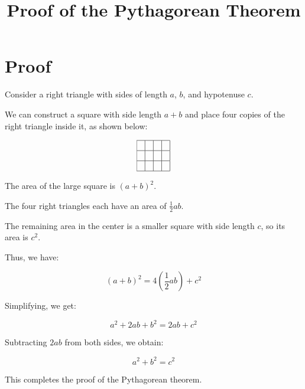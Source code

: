 \documentclass{article}
\begin{document}
\title{Proof of the Pythagorean Theorem}
\author{}
\date{}
\maketitle

\section*{Proof}

Consider a right triangle with sides of length \(a\), \(b\), and hypotenuse \(c\).

We can construct a square with side length \(a + b\) and place four copies of the right triangle inside it, as shown below:

\[
\begin{array}{|c|c|c|c|}
\hline
& & & \\
\hline
& & & \\
\hline
& & & \\
\hline
\end{array}
\]

The area of the large square is \((a + b)^2\).

The four right triangles each have an area of \(\frac{1}{2}ab\).

The remaining area in the center is a smaller square with side length \(c\), so its area is \(c^2\).

Thus, we have:

\[
(a + b)^2 = 4 \left( \frac{1}{2} ab \right) + c^2
\]

Simplifying, we get:

\[
a^2 + 2ab + b^2 = 2ab + c^2
\]

Subtracting \(2ab\) from both sides, we obtain:

\[
a^2 + b^2 = c^2
\]

This completes the proof of the Pythagorean theorem.
\end{document}
